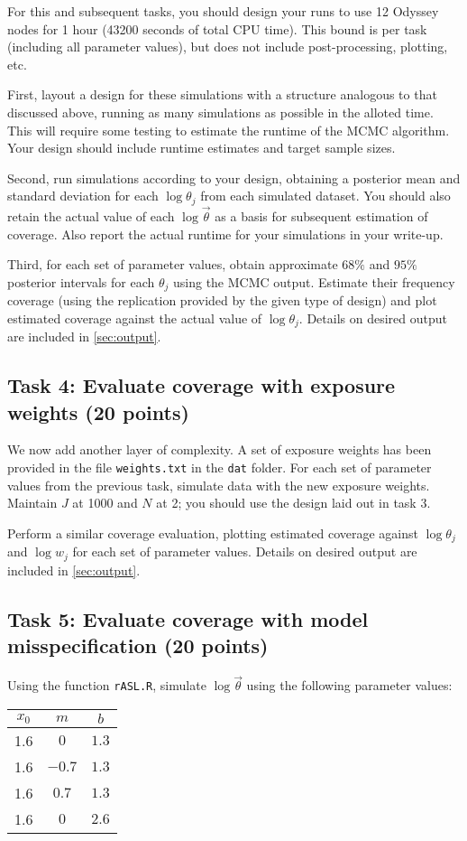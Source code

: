 \documentclass[11pt]{article}
\begin{document}
For this and subsequent tasks, you should design your runs to use 12 Odyssey nodes for 1 hour (43200 seconds of total CPU time). This bound is per task (including all parameter values), but does not include post-processing, plotting, etc.

First, layout a design for these simulations with a structure analogous to that discussed above, running as many simulations as possible in the alloted time. This will require some testing to estimate the runtime of the MCMC algorithm. Your design should include runtime estimates and target sample sizes.

Second, run simulations according to your design, obtaining a posterior mean and standard deviation for each $\log \theta_j$ from each simulated dataset. You should also retain the actual value of each $\log \vec \theta$ as a basis for subsequent estimation of coverage. Also report the actual runtime for your simulations in your write-up.

Third, for each set of parameter values, obtain approximate $68\%$ and $95\%$ posterior intervals for each $\theta_j$ using the MCMC output. Estimate their frequency coverage (using the replication provided by the given type of design) and plot estimated coverage against the actual value of $\log \theta_j$. Details on desired output are included in \autoref{sec:output}.

\subsection{Task 4: Evaluate coverage with exposure weights (20 points)}

We now add another layer of complexity. A set of exposure weights has been provided in the file \verb+weights.txt+ in the \verb+dat+ folder. For each set of parameter values from the previous task, simulate data with the new exposure weights. Maintain $J$ at 1000 and $N$ at 2; you should use the design laid out in task 3.

Perform a similar coverage evaluation, plotting estimated coverage against $\log \theta_j$ and $\log w_j$ for each set of parameter values. Details on desired output are included in \autoref{sec:output}.

\subsection{Task 5: Evaluate coverage with model misspecification (20 points)}

Using the function \verb+rASL.R+, simulate $\log \vec \theta$ using the following parameter values:
\begin{table}[ht]
\begin{center}
 \begin{tabular}{c|c|c}
  $x_0$ & $m$ & $b$ \\
  \hline
  1.6 & $0$ & $1.3$\\
  1.6 & $-0.7$ & $1.3$ \\
  1.6 & $0.7$ & $1.3$\\
  1.6 & $0$ & $2.6$
 \end{tabular}
\end{center}
\end{table}
\end{document}
